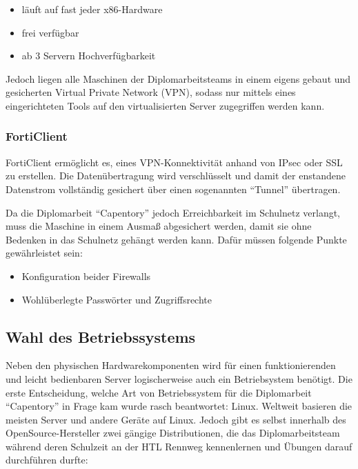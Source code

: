 \begin{itemize}
\tightlist
\item
  läuft auf fast jeder x86-Hardware
\item
  frei verfügbar
\item
  ab 3 Servern Hochverfügbarkeit
\end{itemize}

Jedoch liegen alle Maschinen der Diplomarbeitsteams in einem eigens
gebaut und gesicherten Virtual Private Network (VPN), sodass nur mittels
eines eingerichteten Tools auf den virtualisierten Server zugegriffen
werden kann.

\hypertarget{forticlient}{%
\subsubsection{FortiClient}\label{forticlient}}

FortiClient ermöglicht es, eines VPN-Konnektivität anhand von IPsec oder
SSL zu erstellen. Die Datenübertragung wird verschlüsselt und damit der
enstandene Datenstrom vollständig gesichert über einen sogenannten
``Tunnel'' übertragen.

Da die Diplomarbeit ``Capentory'' jedoch Erreichbarkeit im Schulnetz
verlangt, muss die Maschine in einem Ausmaß abgesichert werden, damit
sie ohne Bedenken in das Schulnetz gehängt werden kann. Dafür müssen
folgende Punkte gewährleistet sein:

\begin{itemize}
\tightlist
\item
  Konfiguration beider Firewalls
\item
  Wohlüberlegte Passwörter und Zugriffsrechte
\end{itemize}

\hypertarget{wahl-des-betriebssystems}{%
\subsection{Wahl des Betriebssystems}\label{wahl-des-betriebssystems}}

Neben den physischen Hardwarekomponenten wird für einen funktionierenden
und leicht bedienbaren Server logischerweise auch ein Betriebsystem
benötigt. Die erste Entscheidung, welche Art von Betriebssystem für die
Diplomarbeit ``Capentory'' in Frage kam wurde rasch beantwortet: Linux.
Weltweit basieren die meisten Server und andere Geräte auf Linux. Jedoch
gibt es selbst innerhalb des OpenSource-Hersteller zwei gängige
Distributionen, die das Diplomarbeitsteam während deren Schulzeit an der
HTL Rennweg kennenlernen und Übungen darauf durchführen durfte:

